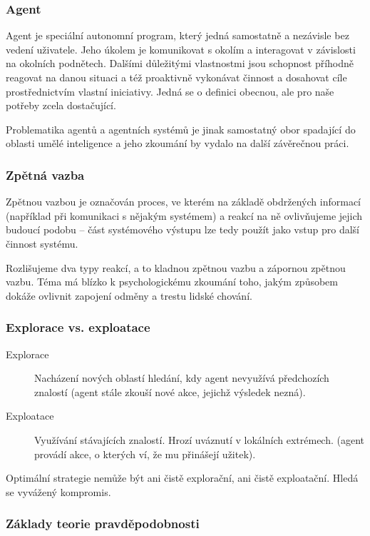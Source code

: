 \documentclass[thesis=M,czech]{FITthesis}[2014/05/07]
\begin{document}
\subsubsection{Agent}
\label{agent}
Agent je speciální autonomní program, který jedná samostatně a nezávisle bez vedení uživatele. Jeho úkolem je komunikovat s okolím a interagovat v závislosti na okolních podnětech. Dalšími důležitými vlastnostmi jsou schopnost příhodně reagovat na danou situaci a též proaktivně vykonávat činnost a dosahovat cíle prostřednictvím vlastní iniciativy. Jedná se o definici obecnou, ale pro naše potřeby zcela dostačující.

Problematika agentů a agentních systémů je jinak samostatný obor spadající do oblasti umělé inteligence a jeho zkoumání by vydalo na další závěrečnou práci. 

\subsubsection{Zpětná vazba}
\label{feedback}
Zpětnou vazbou je označován proces, ve kterém na základě obdržených informací (například při komunikaci s nějakým systémem) a reakcí na ně ovlivňujeme jejich budoucí podobu – část systémového výstupu lze tedy použít jako vstup pro další činnost systému.

Rozlišujeme dva typy reakcí, a to kladnou zpětnou vazbu a zápornou zpětnou vazbu. Téma má blízko k psychologickému zkoumání toho, jakým způsobem dokáže ovlivnit zapojení odměny a trestu lidské chování.

\subsubsection{Explorace vs. exploatace}
\label{sub:explo}

\begin{description}
  \item[Explorace] Nacházení nových oblastí hledání, kdy agent nevyužívá předchozích znalostí (agent stále zkouší nové akce, jejichž výsledek nezná).
  \item[Exploatace] Využívání stávajících znalostí. Hrozí uváznutí v lokálních extrémech. (agent provádí akce, o kterých ví, že mu přinášejí užitek). 
\end{description}	

Optimální strategie nemůže být ani čistě explorační, ani čistě exploatační. Hledá se vyvážený kompromis.

\subsubsection{Základy teorie pravděpodobnosti}
\end{document}
